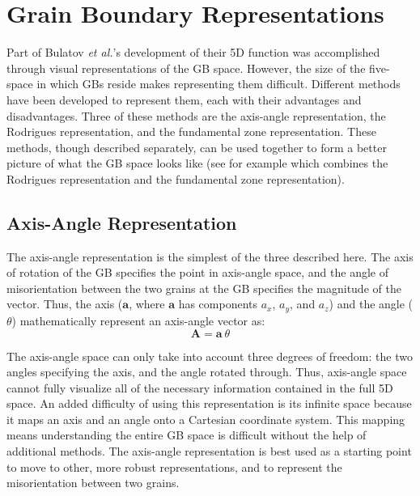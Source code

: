 \documentclass[twoside,senior]{BYUPhys}
\begin{document}
\chapter{Grain Boundary Representations\label{app:gbRep}}
Part of Bulatov \emph{et al.}'s development of their 5D function was accomplished through visual representations of the GB space.  However, the size of the five-space in which GBs reside makes representing them difficult.  Different methods have been developed to represent them, each with their advantages and disadvantages.  Three of these methods are the axis-angle representation, the Rodrigues representation, and the fundamental zone representation.  These methods, though described separately, can be used together to form a better picture of what the GB space looks like (see for example  which combines the Rodrigues representation and the fundamental zone representation).

\section{Axis-Angle Representation\label{GBReps:AA}}
The axis-angle representation is the simplest of the three described here.  The axis of rotation of the GB specifies the point in axis-angle space, and the angle of misorientation between the two grains at the GB specifies the magnitude of the vector.  Thus, the axis ($\bm{a}$, where $\bm{a}$ has components $a_x$, $a_y$, and $a_z$) and the angle ($\theta$) mathematically represent an axis-angle vector as:
\begin{equation}
\bm{A} = \bm{a}\ \theta
\label{eq:aaVec}
\end{equation} 

The axis-angle space can only take into account three degrees of freedom: the two angles specifying the axis, and the angle rotated through.  Thus, axis-angle space cannot fully visualize all of the necessary information contained in the full 5D space.\cite{frank1988} An added difficulty of using this representation is its infinite space because it maps an axis and an angle onto a Cartesian coordinate system.  This mapping means understanding the entire GB space is difficult without the help of additional methods.  The axis-angle representation is best used as a starting point to move to other, more robust representations, and to represent the misorientation between two grains.\cite{randle2000}
\end{document}
